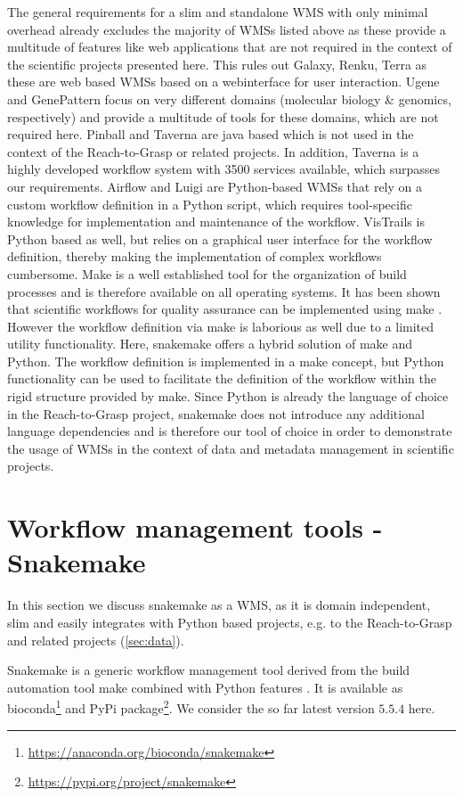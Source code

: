 The general requirements for a slim and standalone WMS with only minimal overhead already excludes the majority of WMSs listed above as these provide a multitude of features like web applications that are not required in the context of the scientific projects presented here. This rules out Galaxy, Renku, Terra as these are web based WMSs based on a webinterface for user interaction. Ugene and GenePattern focus on very different domains (molecular biology \& genomics, respectively) and provide a multitude of tools for these domains, which are not required here. Pinball and Taverna are java based which is not used in the context of the Reach-to-Grasp or related projects.  In addition, Taverna is a highly developed workflow system with 3500 services available, which surpasses our requirements. Airflow and Luigi are Python-based WMSs that rely on a custom workflow definition in a Python script, which requires tool-specific knowledge for implementation and maintenance of the workflow. VisTrails is Python based as well, but relies on a graphical user interface for the workflow definition, thereby making the implementation of complex workflows cumbersome. Make is a well established tool for the organization of build processes and is therefore available on all operating systems. It has been shown that scientific workflows for quality assurance can be implemented using make \citep{Askren_2016}. However the workflow definition via make is laborious as well due to a limited utility functionality. Here, snakemake offers a hybrid solution of make and Python. The workflow definition is implemented in a make concept, but Python functionality can be used to facilitate the definition of the workflow within the rigid structure provided by make. Since Python is already the language of choice in the Reach-to-Grasp project, snakemake does not introduce any additional language dependencies and is therefore our tool of choice in order to demonstrate the usage of WMSs in the context of data and metadata management in scientific projects.


\section{Workflow management tools - Snakemake}
\label{sec:snakemake}
In this section we discuss snakemake as a WMS, as it is domain independent, slim and easily integrates with Python based projects, e.g. to the Reach-to-Grasp and related projects (\cref{sec:data}).

Snakemake is a generic workflow management tool derived from the build automation tool make combined with Python features \citep{Koster_2012}. It is available as bioconda\footnote{\url{https://anaconda.org/bioconda/snakemake}} and PyPi package\footnote{\url{https://pypi.org/project/snakemake}}. We consider the so far latest version $5.5.4$ here.

